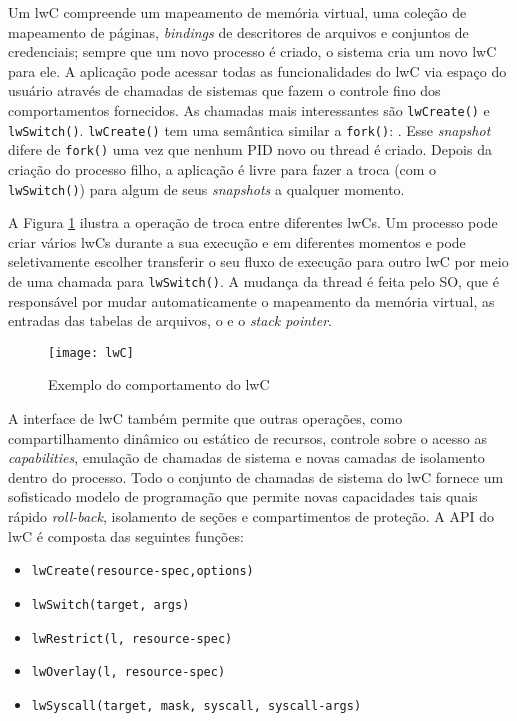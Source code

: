 Um lwC compreende um mapeamento de memória virtual, uma coleção de mapeamento
de páginas, \emph{bindings} de descritores de arquivos e conjuntos de
credenciais; sempre que um novo processo é criado, o sistema cria um novo lwC
para ele. A aplicação pode acessar todas as funcionalidades do lwC via espaço
do usuário através de chamadas de sistemas que fazem o controle fino dos
comportamentos fornecidos. As chamadas mais interessantes são
\texttt{lwCreate()} e \texttt{lwSwitch()}. \texttt{lwCreate()} tem uma
semântica similar a \texttt{fork()}: . Esse \emph{snapshot}
difere de \texttt{fork()} uma vez que nenhum PID novo ou thread é criado.
Depois da criação do processo filho, a aplicação é livre para fazer a troca
(com o \texttt{lwSwitch()}) para algum de seus \emph{snapshots} a qualquer
momento.

A Figura \ref{fig:lwc} ilustra a operação de troca entre diferentes lwCs. Um
processo pode criar vários lwCs durante a sua execução e em
diferentes momentos e pode
seletivamente escolher transferir o seu fluxo de execução para outro lwC por
meio de uma chamada para \texttt{lwSwitch()}. A mudança da thread é feita pelo
SO, que é responsável por mudar automaticamente o mapeamento da memória virtual,
as entradas das tabelas de arquivos, o  e o \emph{stack
pointer}.

\begin{figure}[!h]
  \centering
  \texttt{[image: lwC]} 
  \caption{Exemplo do comportamento do lwC}
  \label{fig:lwc} 
\end{figure}

A interface de lwC também permite que outras operações, como compartilhamento
dinâmico ou estático de recursos, controle sobre o acesso as
\emph{capabilities}, emulação de chamadas de sistema e novas camadas de
isolamento dentro do processo. Todo o conjunto de chamadas de sistema do lwC
fornece um sofisticado modelo de programação que permite novas capacidades
tais quais rápido \emph{roll-back}, isolamento de seções e compartimentos de
proteção. A API do lwC é composta das seguintes funções:


\begin{itemize}
  \item \texttt{lwCreate(resource-spec,options)}
  \item \texttt{lwSwitch(target, args)}
  \item \texttt{lwRestrict(l, resource-spec)}
  \item \texttt{lwOverlay(l, resource-spec)}
  \item \texttt{lwSyscall(target, mask, syscall, syscall-args)}
\end{itemize}

